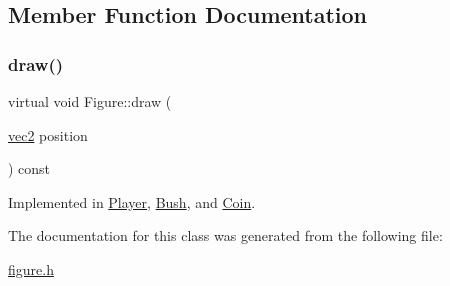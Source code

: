 \subsection{Member Function Documentation}
\mbox{\label{classFigure_ac16583e764bdc244076957bf775e4866}} 
\subsubsection{\texorpdfstring{draw()}{draw()}}
{\footnotesize\ttfamily virtual void Figure\+::draw (\begin{DoxyParamCaption}\item[{\hyperlink{structvec2}{vec2}}]{position }\end{DoxyParamCaption}) const\hspace{0.3cm}{\ttfamily [pure virtual]}}



Implemented in \hyperlink{classPlayer_adcaf37d2753307e8a7672bd32c441576}{Player}, \hyperlink{classBush_aa73b14744dbe2b868142dc2deae485ba}{Bush}, and \hyperlink{classCoin_a13812f35d85e19553fe36350c947204c}{Coin}.



The documentation for this class was generated from the following file\+:\begin{DoxyCompactItemize}
\item 
\hyperlink{figure_8h}{figure.\+h}\end{DoxyCompactItemize}
